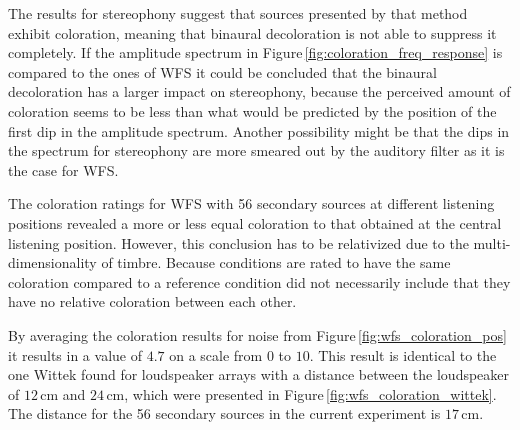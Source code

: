 The results for stereophony suggest that sources presented by that method
exhibit coloration, meaning that binaural decoloration is not able to suppress
it completely. If the amplitude spectrum in
Figure\,\ref{fig:coloration_freq_response} is compared to the ones of \ac{WFS} it
could be concluded that the binaural decoloration has a larger impact on
stereophony, because the perceived amount of coloration seems to be less than
what would be predicted by the position of the first dip in the amplitude
spectrum.
Another possibility might be that the dips in the spectrum for stereophony are
more smeared out by the auditory filter as it is the case for \ac{WFS}.

The coloration ratings for \ac{WFS} with 56 secondary sources at
different listening positions revealed a more or less equal coloration to 
that obtained at the central listening position. However, this conclusion has to
be relativized due to the multi-dimensionality of timbre. Because conditions
are rated to have the same coloration compared to a reference condition did not
necessarily include that they have no relative coloration between each other.

By averaging the coloration results for noise from
Figure\,\ref{fig:wfs_coloration_pos} it results in a value of $4.7$
on a scale from $0$ to $10$.
This result is identical to the one Wittek\autocite{Wittek2007} found
for loudspeaker arrays with a distance between the loudspeaker of $12$\,cm and
$24$\,cm, which were presented in Figure\,\ref{fig:wfs_coloration_wittek}.
The distance for the 56 secondary sources in the current experiment is
$17$\,cm.

